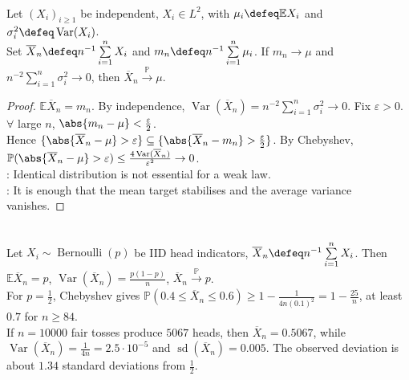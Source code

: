 \begin{proposition} \label{prop:weak-law-independent-nonidentical} \\
Let $(X_i)_{i\geq1}$ be independent, $X_i\in L^2$, with $\mu_i\defeq\mathbb{E}X_i$ and $\sigma_i^2\defeq\operatorname{Var}(X_i)$.\\
Set $\overline{X}_n\defeq n^{-1}\sum\limits_{i=1}^{n}X_i$ and $m_n\defeq n^{-1}\sum\limits_{i=1}^{n}\mu_i$. If $m_n\to\mu$ and $n^{-2}\sum\limits_{i=1}^{n}\sigma_i^2\to0$, then $\overline{X}_n\xrightarrow{\mathbb{P}}\mu$.
\begin{proof} $\mathbb{E}\overline{X}_n=m_n$. By independence, $\operatorname{Var}(\overline{X}_n)=n^{-2}\sum\limits_{i=1}^{n}\sigma_i^2\to0$. Fix $\varepsilon>0$. $\forall$ large $n$, $\abs{m_n-\mu}<\frac{\varepsilon}{2}$.\\
Hence $\{\abs{\overline{X}_n-\mu}>\varepsilon\}\subseteq\{\abs{\overline{X}_n-m_n}>\frac{\varepsilon}{2}\}$. By Chebyshev, $\mathbb{P}(\abs{\overline{X}_n-\mu}>\varepsilon)\leq\frac{4\operatorname{Var}(\overline{X}_n)}{\varepsilon^2}\to0$.\\
: Identical distribution is not essential for a weak law.\\
: It is enough that the mean target stabilises and the average variance vanishes.
\end{proof}
\end{proposition}

\begin{example} \label{ex:coin-proportion-weak-law-bound} \\
Let $X_i\sim\operatorname{Bernoulli}(p)$ be IID head indicators, $\overline{X}_n\defeq n^{-1}\sum\limits_{i=1}^{n}X_i$. Then $\mathbb{E}\overline{X}_n=p$, $\operatorname{Var}(\overline{X}_n)=\frac{p(1-p)}{n}$, $\overline{X}_n\xrightarrow{\mathbb{P}}p$. \\
For $p=\frac{1}{2}$, Chebyshev gives $\mathbb{P}(0.4\leq\overline{X}_n\leq0.6)\geq1-\frac{1}{4n(0.1)^2}=1-\frac{25}{n}$, at least $0.7$ for $n\geq84$.\\
If $n=10000$ fair tosses produce $5067$ heads, then $\overline{X}_n=0.5067$, while $\operatorname{Var}(\overline{X}_n)=\frac{1}{4n}=2.5\cdot10^{-5}$ and $\operatorname{sd}(\overline{X}_n)=0.005$. The observed deviation is about $1.34$ standard deviations from $\frac{1}{2}$.
\end{example}

